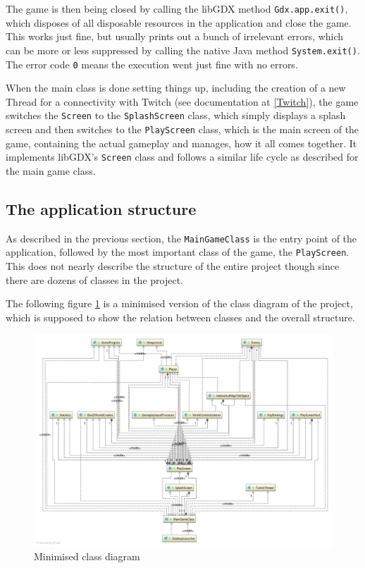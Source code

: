 \documentclass[12p]{article}
\begin{document}
The game is then being closed by calling the libGDX method \texttt{Gdx.app.exit()}, which disposes of all disposable resources in the application and close the game. This works just fine, but usually prints out a bunch of irrelevant errors, which can be more or less suppressed by calling the native Java method \texttt{System.exit()}. The error code \texttt{0} means the execution went just fine with no errors.

When the main class is done setting things up, including the creation of a new Thread for a connectivity with Twitch (see documentation at \ref{Twitch}), the game switches the \texttt{Screen} to the \texttt{SplashScreen} class, which simply displays a splash screen and then switches to the \texttt{PlayScreen} class, which is the main screen of the game, containing the actual gameplay and manages, how it all comes together. It implements libGDX's \texttt{Screen} class and follows a similar life cycle as described for the main game class.


\subsection{The application structure} \label{DocApplicationStructure}

As described in the previous section, the \texttt{MainGameClass} is the entry point of the application, followed by the most important class of the game, the \texttt{PlayScreen}. This does not nearly describe the structure of the entire project though since there are dozens of classes in the project.

The following figure \ref{fig:minClassDiagram} is a minimised version of the class diagram of the project, which is supposed to show the relation between classes and the overall structure.

\begin{figure}[ht]
  \centering
  \includegraphics[width=1\textwidth]{Documentation/class_diagram_minimized.png}
  \caption{Minimised class diagram}
  \label{fig:minClassDiagram}
\end{figure}
\end{document}
